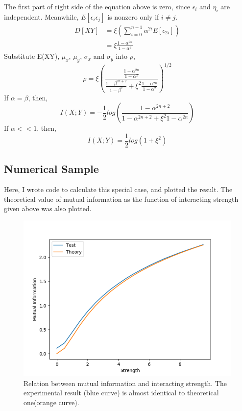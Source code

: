 \documentclass{article}
\begin{document}
		The first part of right side of the equation above is zero, since $\epsilon_i$ and $\eta_i$ are independent. Meanwhile, $E[\epsilon_i\epsilon_j]$ is nonzero only if $i\neq j$.
		\begin{equation}
			\begin{aligned}
				D[XY] & =	\xi (\sum^{n-1}_{i=0}\alpha^{2i}E[\epsilon_{2i}]) \\
				& = \xi \frac{1-\alpha^{2n}}{1-\alpha^2}
			\end{aligned}
		\end{equation}
		Substitute E(XY), $\mu_x$, $\mu_y$, $\sigma_x$ and $\sigma_y$ into $\rho$,
		\begin{equation}
			\rho = \xi(\frac{\frac{1-\alpha^{2n}}{1-\alpha^2}}{\frac{1-\beta^{2n+2}}{1-\beta^2} + \xi^2\frac{1-\alpha^{2n}}{1-\alpha^2}})^{1/2}
		\end{equation}
		If $\alpha = \beta$, then,
		\begin{equation}
			I(X;Y) = -\frac{1}{2}log(\frac{{1-\alpha^{2n+2}}}{{1-\alpha^{2n+2}} + \xi^2{1-\alpha^{2n}}})
		\end{equation}
		If $\alpha << 1$, then,
		\begin{equation}
			I(X;Y) = \frac{1}{2}log(1 + \xi^2)
		\end{equation}
		\subsection{Numerical Sample}
		Here, I wrote code to calculate this special case, and plotted the result. The theoretical value of mutual information as the function of interacting strength given above was also plotted.
		\begin{figure}[h]
			\centering
			\includegraphics[scale = 0.5]{linear.png}
			\caption{Relation between mutual information and interacting strength. The experimental result (blue curve) is almost identical to theoretical one(orange curve).}
		\end{figure}
\end{document}
